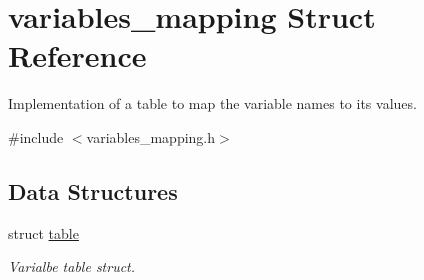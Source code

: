 \hypertarget{structvariables__mapping}{\section{variables\-\_\-mapping Struct Reference}
\label{structvariables__mapping}
}


Implementation of a table to map the variable names to its values.  




{\ttfamily \#include $<$variables\-\_\-mapping.\-h$>$}

\subsection*{Data Structures}
\begin{DoxyCompactItemize}
\item 
struct \hyperlink{structvariables__mapping_1_1table}{table}
\begin{DoxyCompactList}\small\item\em Varialbe table struct. \end{DoxyCompactList}\end{DoxyCompactItemize}
